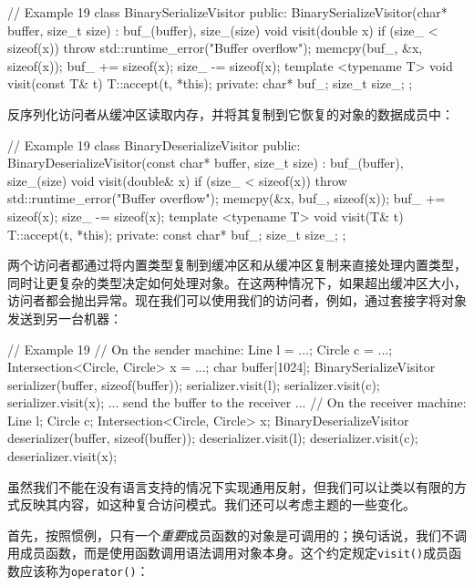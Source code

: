 \begin{code}
{\begin{code}
// Example 19
class BinarySerializeVisitor {
  public:
  BinarySerializeVisitor(char* buffer, size_t size) :
    buf_(buffer), size_(size) {}
  void visit(double x) {
    if (size_ < sizeof(x))
      throw std::runtime_error("Buffer overflow");
    memcpy(buf_, &x, sizeof(x));
    buf_ += sizeof(x);
    size_ -= sizeof(x);
  }
  template <typename T> void visit(const T& t) {
    T::accept(t, *this);
  }
  private:
  char* buf_;
  size_t size_;
};
\end{code}

反序列化访问者从缓冲区读取内存，并将其复制到它恢复的对象的数据成员中：

\begin{code}
// Example 19
class BinaryDeserializeVisitor {
  public:
  BinaryDeserializeVisitor(const char* buffer, size_t size)
    : buf_(buffer), size_(size) {}
  void visit(double& x) {
    if (size_ < sizeof(x))
      throw std::runtime_error("Buffer overflow");
    memcpy(&x, buf_, sizeof(x));
    buf_ += sizeof(x);
    size_ -= sizeof(x);
  }
  template <typename T> void visit(T& t) {
    T::accept(t, *this);
  }
  private:
  const char* buf_;
  size_t size_;
};
\end{code}

两个访问者都通过将内置类型复制到缓冲区和从缓冲区复制来直接处理内置类型，同时让更复杂的类型决定如何处理对象。在这两种情况下，如果超出缓冲区大小，访问者都会抛出异常。现在我们可以使用我们的访问者，例如，通过套接字将对象发送到另一台机器：

\begin{code}
// Example 19
// On the sender machine:
Line l = ...;
Circle c = ...;
Intersection<Circle, Circle> x = ...;
char buffer[1024];
BinarySerializeVisitor serializer(buffer, sizeof(buffer));
serializer.visit(l);
serializer.visit(c);
serializer.visit(x);
... send the buffer to the receiver ...
// On the receiver machine:
Line l;
Circle c;
Intersection<Circle, Circle> x;
BinaryDeserializeVisitor deserializer(buffer, 
  sizeof(buffer));
deserializer.visit(l);
deserializer.visit(c);
deserializer.visit(x);
\end{code}

虽然我们不能在没有语言支持的情况下实现通用反射，但我们可以让类以有限的方式反映其内容，如这种复合访问模式。我们还可以考虑主题的一些变化。

首先，按照惯例，只有一个\emph{重要}成员函数的对象是可调用的；换句话说，我们不调用成员函数，而是使用函数调用语法调用对象本身。这个约定规定\texttt{visit()}成员函数应该称为\texttt{operator()}：

}
\end{code}
